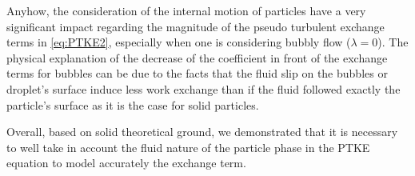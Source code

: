 \documentclass[12pt,a4paper]{article}
\begin{document}
Anyhow, the consideration of the internal motion of particles have a very significant impact regarding the magnitude of the pseudo turbulent exchange terms in \eqref{eq:PTKE2}, especially when one is considering bubbly flow ($\lambda = 0$). 
The physical explanation of the decrease of the coefficient in front of the exchange terms for bubbles can be due to the facts that the fluid slip on the bubbles or droplet's surface induce less work exchange than if the fluid followed exactly the particle's surface as it is the case for solid particles. 


Overall, based on solid theoretical ground, we demonstrated that it is necessary to well take in account the fluid nature of the particle phase in the PTKE equation to model accurately the exchange term.

 



\end{document}
